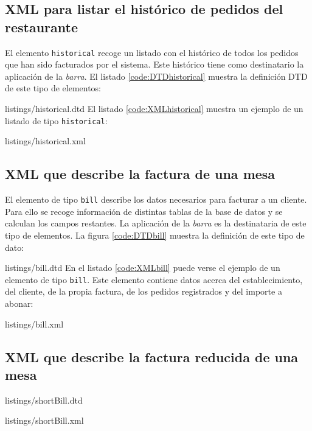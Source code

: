 \subsection{\acs{XML} para listar el histórico de pedidos del restaurante}
El elemento \texttt{historical} recoge un listado con el histórico de todos los 
pedidos que han sido facturados por el sistema. Este histórico tiene como
destinatario la aplicación de la \emph{barra}. El listado
\ref{code:DTDhistorical} muestra la definición \acs{DTD} de este tipo de 
elementos:

{listings/historical.dtd}
El listado \ref{code:XMLhistorical} muestra un ejemplo de un listado de tipo
\texttt{historical}:

{listings/historical.xml}

\subsection{\acs{XML} que describe la factura de una mesa}
El elemento de tipo \texttt{bill} describe los datos necesarios para
facturar a un cliente. Para ello se recoge información de distintas tablas
de la base de datos y se calculan los campos restantes. La aplicación de la
\emph{barra} es la destinataria de este tipo de elementos. La figura 
\ref{code:DTDbill} muestra la definición de este tipo de dato:

{listings/bill.dtd}
En el listado \ref{code:XMLbill} puede verse el ejemplo de un elemento de tipo
\texttt{bill}. Este elemento contiene datos acerca del establecimiento, del
cliente, de la propia factura, de los pedidos registrados y del importe a
abonar:

{listings/bill.xml}

\subsection{\acs{XML} que describe la factura reducida de una mesa}

{listings/shortBill.dtd}

{listings/shortBill.xml}

